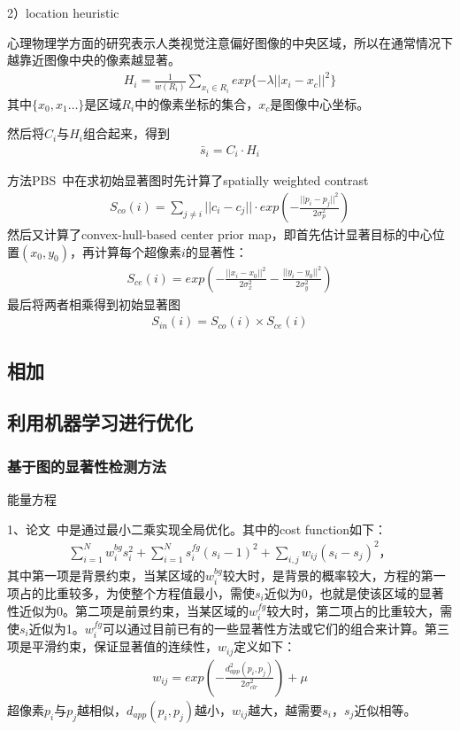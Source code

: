 \documentclass[12pt]{article}
\begin{document}
2）location heuristic

心理物理学方面的研究表示人类视觉注意偏好图像的中央区域，所以在通常情况下越靠近图像中央的像素越显著。
\begin{align}
H_i = \frac{1}{w(R_i)}\sum_{x_i \in R_i} exp\{-\lambda||x_i-x_c||^2\}
\end{align}
其中$\{x_0, x_1\ldots\}$是区域$R_i$中的像素坐标的集合，$x_c$是图像中心坐标。

然后将$C_i$与$H_i$组合起来，得到
\begin{align}
\bar{s}_i = C_i \cdot H_i
\end{align}

方法PBS~\cite{yang2013graph}中在求初始显著图时先计算了spatially weighted contrast
\begin{align}
S_{co}(i) = \sum_{j \ne i}||c_i-c_j|| \cdot exp\left(-\frac{||p_i-p_j||^2}{2\sigma_p^2}\right)
\end{align}
然后又计算了convex-hull-based center prior map，即首先估计显著目标的中心位置$(x_0, y_0)$，再计算每个超像素$i$的显著性：
\begin{align}
S_{ce}(i) = exp\left(-\frac{||x_i-x_0||^2}{2\sigma_x^2}-\frac{||y_i-y_0||^2}{2\sigma_y^2}\right)
\end{align}
最后将两者相乘得到初始显著图
\begin{align}
S_{in}(i) = S_{co}(i) \times S_{ce}(i)
\end{align}


\subsection{相加}

\subsection{利用机器学习进行优化}

\subsubsection{基于图的显著性检测方法}

能量方程

1、论文~\cite{zhu2014saliency}中是通过最小二乘实现全局优化。其中的cost function如下：
\begin{align}
\sum_{i=1}^{N}w_i^{bg}s_i^2+\sum_{i=1}^{N}s_i^{fg}(s_i-1)^2+\sum_{i, j}w_{ij}(s_i-s_j)^2，
\end{align}
其中第一项是背景约束，当某区域的$w_i^{bg}$较大时，是背景的概率较大，方程的第一项占的比重较多，为使整个方程值最小，需使$s_i$近似为0，也就是使该区域的显著性近似为0。第二项是前景约束，当某区域的$w_i^{fg}$较大时，第二项占的比重较大，需使$s_i$近似为1。$w_i^{fg}$可以通过目前已有的一些显著性方法或它们的组合来计算。第三项是平滑约束，保证显著值的连续性，$w_{ij}$定义如下：
\begin{align}
w_{ij} = exp(-\frac{d_{app}^2(p_i, p_j)}{2\sigma_{clr}^2})+\mu
\end{align}
超像素$p_i$与$p_j$越相似，$d_{app}(p_i, p_j)$越小，$w_{ij} $越大，越需要$s_i$，$s_j$近似相等。
\end{document}

